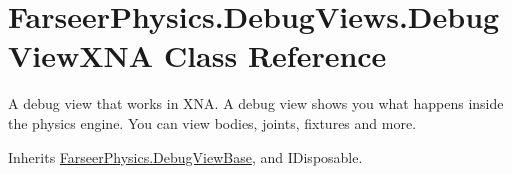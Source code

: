 \hypertarget{class_farseer_physics_1_1_debug_views_1_1_debug_view_x_n_a}{\section{Farseer\+Physics.\+Debug\+Views.\+Debug\+View\+X\+N\+A Class Reference}
\label{class_farseer_physics_1_1_debug_views_1_1_debug_view_x_n_a}
}


A debug view that works in X\+N\+A. A debug view shows you what happens inside the physics engine. You can view bodies, joints, fixtures and more.  




Inherits \hyperlink{class_farseer_physics_1_1_debug_view_base}{Farseer\+Physics.\+Debug\+View\+Base}, and I\+Disposable.

